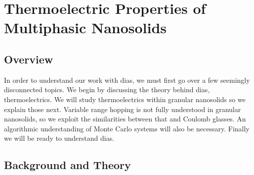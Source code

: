 \chapter{Thermoelectric Properties of Multiphasic Nanosolids}		%
\label{theorychap}

\section{Overview}
In order to understand our work with {\sc dias}, we must first go over a few seemingly disconnected topics. We begin by discussing the theory behind {\sc dias}, thermoelectrics. We will study thermoelectrics within granular nanosolids so we explain those next. Variable range hopping is not fully understood in granular nanosolids, so we exploit the similarities between that and Coulomb glasses. An algorithmic understanding of Monte Carlo systems will also be necessary. Finally we will be ready to understand {\sc dias}. 
\section{Background and Theory}
